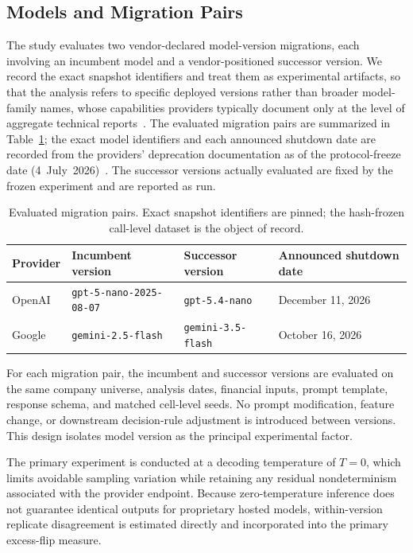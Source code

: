 \documentclass[11pt]{article}
\begin{document}
\subsection{Models and Migration Pairs}
The study evaluates two vendor-declared model-version migrations, each involving an incumbent model and a vendor-positioned successor version. We record the exact snapshot identifiers and treat them as experimental artifacts, so that the analysis refers to specific deployed versions rather than broader model-family names, whose capabilities providers typically document only at the level of aggregate technical reports~\cite{gpt4}. The evaluated migration pairs are summarized in Table~\ref{tab:models}; the exact model identifiers and each announced shutdown date are recorded from the providers' deprecation documentation as of the protocol-freeze date (4~July~2026)~\cite{openai_dep,google_dep}. The successor versions actually evaluated are fixed by the frozen experiment and are reported as run.

\begin{table}[t]
\centering
\caption{Evaluated migration pairs. Exact snapshot identifiers are pinned; the hash-frozen call-level dataset is the object of record.}
\label{tab:models}
\begin{tabular}{@{}llll@{}}
\toprule
Provider & Incumbent version & Successor version & Announced shutdown date \\
\midrule
OpenAI & \texttt{gpt-5-nano-2025-08-07} & \texttt{gpt-5.4-nano} & December 11, 2026 \\
Google & \texttt{gemini-2.5-flash} & \texttt{gemini-3.5-flash} & October 16, 2026 \\
\bottomrule
\end{tabular}
\end{table}

For each migration pair, the incumbent and successor versions are evaluated on the same company universe, analysis dates, financial inputs, prompt template, response schema, and matched cell-level seeds. No prompt modification, feature change, or downstream decision-rule adjustment is introduced between versions. This design isolates model version as the principal experimental factor.

The primary experiment is conducted at a decoding temperature of $T=0$, which limits avoidable sampling variation while retaining any residual nondeterminism associated with the provider endpoint. Because zero-temperature inference does not guarantee identical outputs for proprietary hosted models, within-version replicate disagreement is estimated directly and incorporated into the primary excess-flip measure.
\end{document}
